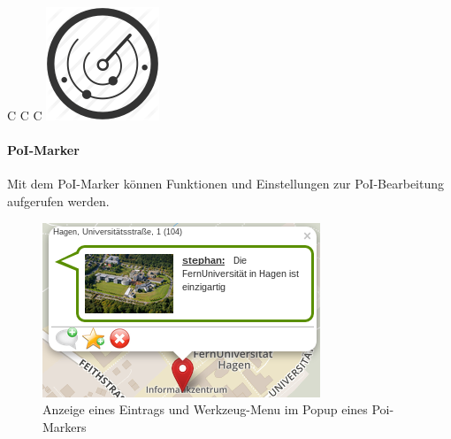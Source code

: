 \begin{table}[H]
\begin{tabulary}{\columnwidth}{ C C C }
	\includegraphics[scale=0.15]{bilder/icons/radar.png} \\
  \end{tabulary}
\end{table}

\enlargethispage{2\baselineskip} %
\paragraph{PoI-Marker}
Mit dem PoI-Marker können Funktionen und Einstellungen zur PoI-Bearbeitung aufgerufen werden.

  \begin{figure}[H]
      \centering
	  \includegraphics[scale=0.8]{bilder/screenshots/menu_poimarker.png}\\ 
  	  Anzeige eines Eintrags und Werkzeug-Menu im Popup eines Poi-Markers
  \end{figure}

